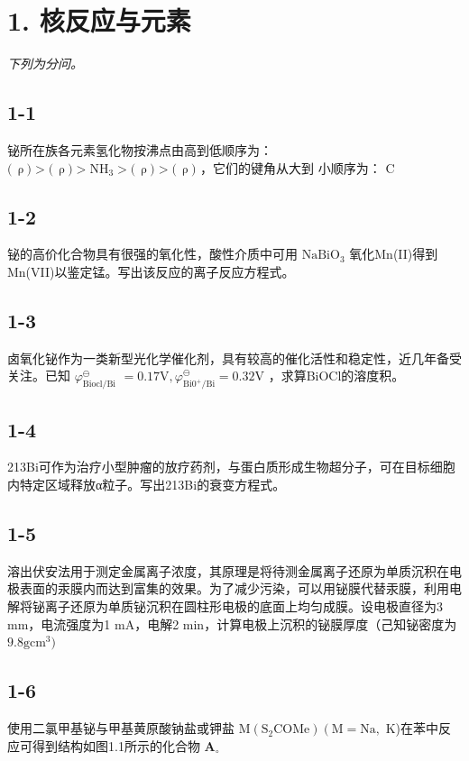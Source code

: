 \section*{1. 核反应与元素}
\textit{下列为分问。}

\subsection*{1-1}
铋所在族各元素氢化物按沸点由⾼到低顺序为： $\big ( \mathrm { ~  ~ \rho ~ } \big ) > \big ( \mathrm { ~  ~ \rho ~ } \big ) > \mathrm { { N H } } _ { 3 } > \big ( \mathrm { ~  ~ \rho ~ } \big ) > \big ( \mathrm { ~  ~ \rho ~ } \big )$ ，它们的键⻆从⼤到 ⼩顺序为： C

\subsection*{1-2}
铋的⾼价化合物具有很强的氧化性，酸性介质中可⽤ $\mathrm { N a B i O _ { 3 } }$ 氧化Mn(II)得到Mn(VII)以鉴定锰。写出该反应的离⼦反应⽅程式。

\subsection*{1-3}
⻧氧化铋作为⼀类新型光化学催化剂，具有较⾼的催化活性和稳定性，近⼏年备受关注。已知 $\varphi _ { \mathrm { B i o c l / B i } } ^ { \ominus }$ $= 0 . 1 7 \mathrm { V } , \varphi _ { \mathrm { B i 0 ^ { + } / B i } } ^ { \ominus } = 0 . 3 2 \mathrm { V }$ ，求算BiOCl的溶度积。

\subsection*{1-4}
213Bi可作为治疗⼩型肿瘤的放疗药剂，与蛋⽩质形成⽣物超分⼦，可在⽬标细胞内特定区域释放α粒⼦。写出213Bi的衰变⽅程式。

\subsection*{1-5}
溶出伏安法⽤于测定⾦属离⼦浓度，其原理是将待测⾦属离⼦还原为单质沉积在电极表⾯的汞膜内⽽达到富集的效果。为了减少污染，可以⽤铋膜代替汞膜，利⽤电解将铋离⼦还原为单质铋沉积在圆柱形电极的底⾯上均匀成膜。设电极直径为3 mm，电流强度为1 mA，电解2 min，计算电极上沉积的铋膜厚度（⼰知铋密度为 $9 . 8 \mathrm { g c m ^ { 3 } } )$

\subsection*{1-6}
使⽤⼆氯甲基铋与甲基⻩原酸钠盐或钾盐 $\mathrm { { M } ( S _ { 2 } C O M e ) \left( M = N a , \right. }$ K)在苯中反应可得到结构如图1.1所⽰的化合物 $\mathbf { A } _ { \circ }$

